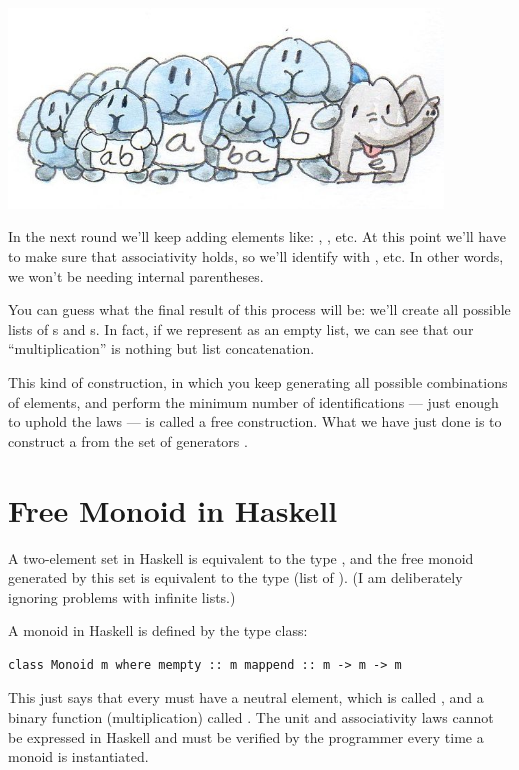 \includegraphics[width=4.54167in]{images/bunnies.jpg}

In the next round we'll keep adding elements like:
, , etc. At this point we'll
have to make sure that associativity holds, so we'll identify
 with , etc. In other words,
we won't be needing internal parentheses.

You can guess what the final result of this process will be: we'll
create all possible lists of s and s. In fact, if we
represent  as an empty list, we can see that our
``multiplication'' is nothing but list concatenation.

This kind of construction, in which you keep generating all possible
combinations of elements, and perform the minimum number of
identifications --- just enough to uphold the laws --- is called a free
construction. What we have just done is to construct a  from the set of generators .

\section{Free Monoid in Haskell}\label{free-monoid-in-haskell}

A two-element set in Haskell is equivalent to the type ,
and the free monoid generated by this set is equivalent to the type
\code{{[}Bool{]}} (list of ). (I am deliberately ignoring
problems with infinite lists.)

A monoid in Haskell is defined by the type class:

\begin{verbatim}
class Monoid m where mempty :: m mappend :: m -> m -> m
\end{verbatim}

This just says that every  must have a neutral element,
which is called , and a binary function (multiplication)
called . The unit and associativity laws cannot be
expressed in Haskell and must be verified by the programmer every time a
monoid is instantiated.

